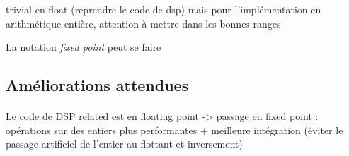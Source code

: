 \documentclass{article}
\begin{document}
    trivial en float (reprendre le code de dsp) mais pour l'implémentation en arithmétique entière, attention à mettre dans les bonnes ranges

    La notation \emph{fixed point} peut se faire 



    \subsection{Améliorations attendues}
    \paragraph{}

    \paragraph{}
    Le code de DSP related est en floating point -> passage en fixed point : opérations sur des entiers plus performantes + meilleure intégration (éviter le passage artificiel de l'entier au flottant et inversement)
\end{document}
